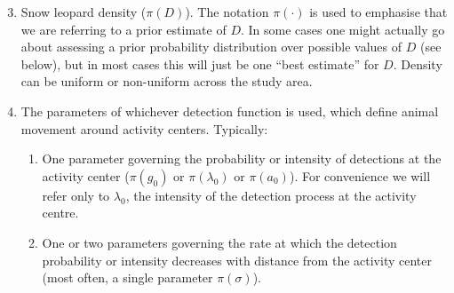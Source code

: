 \documentclass[a4paper,11pt, draft]{article} %
\begin{document}
\begin{enumerate}
\setcounter{enumi}{2}
\item Snow leopard density ($\pi(D)$). The notation $\pi(\cdot)$ is used to emphasise that we are referring to a prior estimate of $D$. In some cases one might actually go about assessing a prior probability distribution over possible values of $D$ (see below), but in most cases this will just be one ``best estimate'' for $D$. Density can be uniform or non-uniform across the study area.
\item The parameters of whichever detection function is used, which define animal movement around activity centers. Typically:
\begin{enumerate} 
\item One parameter governing the probability or intensity of detections at the activity center ($\pi(g_0)$ or $\pi(\lambda_0)$ or $\pi(a_0)$). For convenience we will refer only to $\lambda_0$, the intensity of the detection process at the activity centre.
\item One or two parameters governing the rate at which the detection probability or intensity decreases with distance from the activity center (most often, a single parameter $\pi(\sigma)$).
\end{enumerate}
\end{enumerate}
\end{document}
